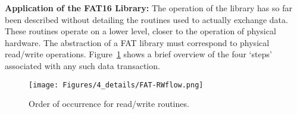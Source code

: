 



\label{ssss:FAT_application}
\textbf{Application of the FAT16 Library:} The operation of the library has so far been described without detailing the routines used to actually exchange data. These routines operate on a lower level, closer to the operation of physical hardware.  The abstraction of a FAT library must correspond to physical read/write operations. Figure~\ref{fig:FAT_readwrite} shows a brief overview of the four `steps' associated with any such data transaction. 

\begin{figure}[H]
    \centering
    \texttt{[image: Figures/4\_details/FAT-RWflow.png]} 
    \caption{Order of occurrence for read/write routines.}
    \label{fig:FAT_readwrite}
\end{figure}


